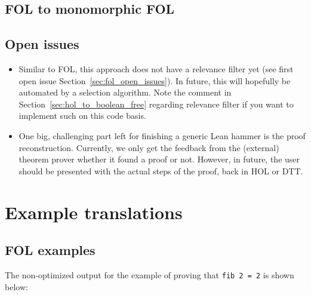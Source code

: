 \documentclass[a4paper]{article}
\begin{document}
\subsection{FOL to monomorphic FOL}
\subsection{Open issues}
\begin{itemize}
	\item Similar to FOL, this approach does not have a relevance filter yet (see first open issue Section~\ref{sec:fol_open_issues}). In future, this will hopefully be automated by a selection algorithm. Note the comment in Section~\ref{sec:hol_to_boolean_free} regarding relevance filter if you want to implement such on this code basis.
	\item One big, challenging part left for finishing a generic Lean hammer is the proof reconstruction. Currently, we only get the feedback from the (external) theorem prover whether it found a proof or not. However, in future, the user should be presented with the actual steps of the proof, back in HOL or DTT.
\end{itemize}

\newpage



\appendix
\section{Example translations}
\subsection{FOL examples}
\label{sec:fol_examples}
The non-optimized output for the example of proving that \texttt{fib 2 = 2} is shown below:
\end{document}
